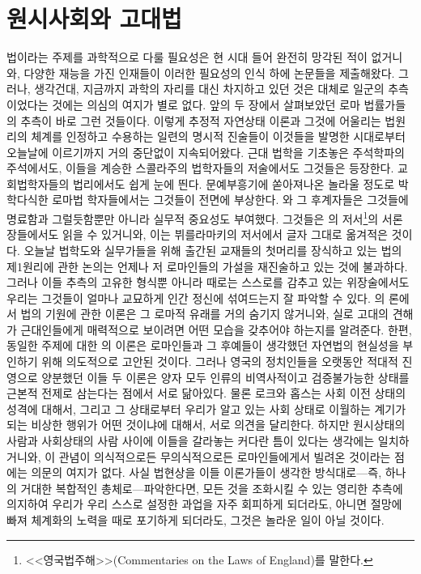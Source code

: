 \chapter{원시사회와 고대법}

법이라는 주제를 과학적으로 다룰 필요성은 현 시대 들어
완전히 망각된 적이 없거니와,
다양한 재능을 가진 인재들이
이러한 필요성의 인식 하에 논문들을 제출해왔다.
그러나, 생각건대,
지금까지 과학의 자리를 대신 차지하고 있던 것은
대체로 일군의 추측이었다는 것에는 의심의 여지가 별로 없다.
앞의 두 장에서 살펴보았던 로마 법률가들의 추측이 바로 그런 것들이다.
이렇게 추정적 자연상태 이론과
그것에 어울리는 법원리의 체계를 인정하고 수용하는 일련의 명시적 진술들이
이것들을 발명한 시대로부터 오늘날에 이르기까지 거의 중단없이 지속되어왔다.
근대 법학을 기초놓은 주석학파의 주석에서도,
이들을 계승한 스콜라주의 법학자들의 저술에서도 그것들은 등장한다.
교회법학자들의 법리에서도 쉽게 눈에 띈다.
문예부흥기에 쏟아져나온 놀라울 정도로 박학다식한
로마법 학자들에서는
그것들이 전면에 부상한다.
와 그 후계자들은 그것들에 명료함과 그럴듯함뿐만 아니라
실무적 중요성도 부여했다.
그것들은 의 저서\footnote{%
  <<영국법주해>>(Commentaries on the Laws of England)를 말한다.
}의 서론 장들에서도 읽을 수 있거니와,
이는 뷔를라마키의 저서에서
글자 그대로 옮겨적은 것이다.
오늘날 법학도와 실무가들을 위해 출간된 교재들의 첫머리를 장식하고 있는
법의 제1원리에 관한 논의는 언제나 저 로마인들의 가설을
재진술하고 있는 것에 불과하다.
그러나 이들 추측의 고유한 형식뿐 아니라
때로는 스스로를 감추고 있는 위장술에서도
우리는 그것들이 얼마나 교묘하게 인간 정신에 섞여드는지 잘 파악할 수 있다.
의 론에서 법의 기원에 관한 이론은
그 로마적 유래를 거의 숨기지 않거니와,
실로 고대의 견해가 근대인들에게 매력적으로 보이려면
어떤 모습을 갖추어야 하는지를 알려준다.
한편, 동일한 주제에 대한 의 이론은
로마인들과 그 후예들이 생각했던 자연법의 현실성을
부인하기 위해 의도적으로 고안된 것이다.
그러나 영국의 정치인들을 오랫동안 적대적 진영으로 양분했던
이들 두 이론은 양자 모두 인류의 비역사적이고 검증불가능한 상태를
근본적 전제로 삼는다는 점에서 서로 닮아있다.
물론 로크와 홉스는 사회 이전 상태의 성격에 대해서, 그리고
그 상태로부터 우리가 알고 있는 사회 상태로 이월하는 계기가 되는
비상한 행위가 어떤 것이냐에 대해서, 서로 의견을 달리한다.
하지만 원시상태의 사람과 사회상태의 사람 사이에
이들을 갈라놓는 커다란 틈이 있다는 생각에는 일치하거니와,
이 관념이 의식적으로든 무의식적으로든
로마인들에게서 빌려온 것이라는 점에는 의문의 여지가 없다.
사실 법현상을 이들 이론가들이 생각한 방식대로---즉, 하나의 거대한
복합적인 총체로---파악한다면, 
모든 것을 조화시킬 수 있는 영리한 추측에 의지하여
우리가 우리 스스로 설정한 과업을 자주 회피하게 되더라도,
아니면 절망에 빠져 체계화의 노력을 때로 포기하게 되더라도,
그것은 놀라운 일이 아닐 것이다.

